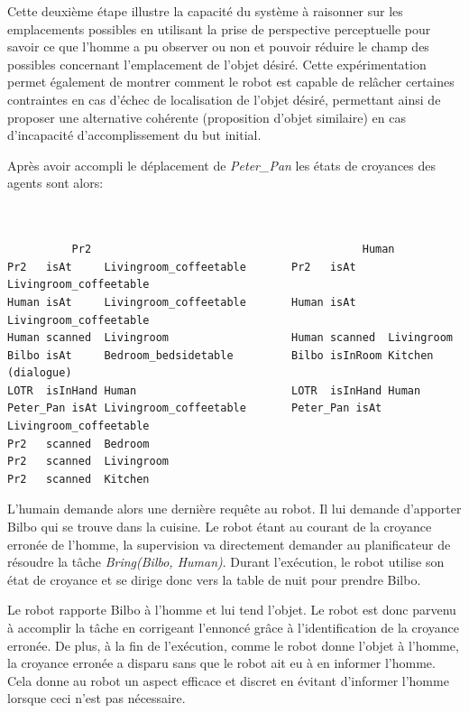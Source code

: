 \documentclass[a4paper,11pt,twoside]{StyleThese}
\begin{document}
Cette deuxième étape illustre la capacité du système à raisonner sur les emplacements possibles en utilisant la prise de perspective perceptuelle pour savoir ce que l'homme a pu observer ou non et pouvoir réduire le champ des possibles concernant l'emplacement de l'objet désiré. Cette expérimentation permet également de montrer comment le robot est capable de relâcher certaines contraintes en cas d'échec de localisation de l'objet désiré, permettant ainsi de proposer une alternative cohérente (proposition d'objet similaire) en cas d'incapacité d'accomplissement du but initial.


Après avoir accompli le déplacement de \textit{Peter\_Pan} les états de croyances des agents sont alors:

\begin{scriptsize}
\begin{verbatim}


          Pr2                                          Human
Pr2   isAt     Livingroom_coffeetable       Pr2   isAt     Livingroom_coffeetable
Human isAt     Livingroom_coffeetable       Human isAt     Livingroom_coffeetable
Human scanned  Livingroom                   Human scanned  Livingroom
Bilbo isAt     Bedroom_bedsidetable         Bilbo isInRoom Kitchen (dialogue)
LOTR  isInHand Human                        LOTR  isInHand Human 
Peter_Pan isAt Livingroom_coffeetable       Peter_Pan isAt Livingroom_coffeetable 
Pr2   scanned  Bedroom
Pr2   scanned  Livingroom
Pr2   scanned  Kitchen

\end{verbatim}
\end{scriptsize}

L'humain demande alors une dernière requête au robot.
Il lui demande d'apporter Bilbo qui se trouve dans la cuisine.
Le robot étant au courant de la croyance erronée de l'homme, la supervision va directement demander au planificateur de résoudre la tâche \textit{Bring(Bilbo, Human)}. Durant l'exécution, le robot utilise son état de croyance et se dirige donc vers la table de nuit pour prendre Bilbo.

Le robot rapporte Bilbo à l'homme et lui tend l'objet.
Le robot est donc parvenu à accomplir la tâche en corrigeant l'ennoncé grâce à l'identification de la croyance erronée. De plus, à la fin de l'exécution, comme le robot donne l'objet à l'homme, la croyance erronée a disparu sans que le robot ait eu à en informer l'homme.
Cela donne au robot un aspect efficace et discret en évitant d'informer l'homme lorsque ceci n'est pas nécessaire.
\end{document}
